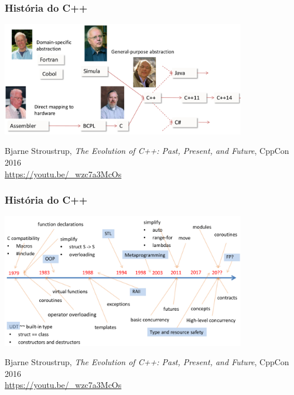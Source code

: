 \documentclass[xcolor={usenames,dvipsnames},10pt,presentation,aspectratio=169]{beamer}
\begin{document}
\begin{frame}
  \frametitle{História do C++}
  \begin{center}
	\includegraphics[width=0.8\textwidth]{roots_cpp.png}
  \end{center}
  {\footnotesize Bjarne Stroustrup, \emph{The Evolution of C++: Past, Present, and Future}, CppCon 2016 \\ \url{https://youtu.be/\_wzc7a3McOs}}
\end{frame}
\begin{frame}
  \frametitle{História do C++}
  \begin{center}
	\includegraphics[width=0.8\textwidth]{cpptimeline.png}
  \end{center}
  {\footnotesize Bjarne Stroustrup, \emph{The Evolution of C++: Past, Present, and Future}, CppCon 2016 \\ \url{https://youtu.be/\_wzc7a3McOs}}
\end{frame}
\end{document}
